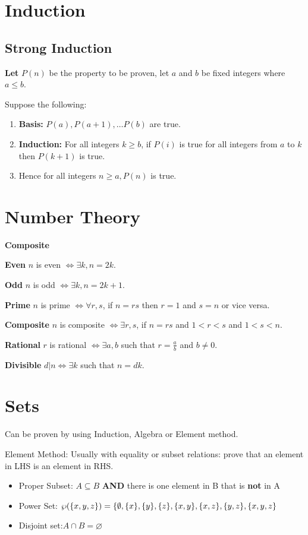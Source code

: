 \documentclass[landscape, letterpaper, 8pt]{extarticle}
\begin{document}
\begin{multicols}{2}
    \section*{Induction}
    \subsection*{Strong Induction}
    \textbf{Let} $P(n)$ be the property to be proven, let $a$ and $b$ be fixed integers where $a\leq b$.

    Suppose the following:
    \begin{enumerate}
        \item \textbf{Basis:} $P(a), P(a+1), \ldots P(b)$ are true.
        \item \textbf{Induction:} For all integers $k\geq b$, if $P(i)$ is true for all integers from $a$ to $k$ then $P(k+1)$ is true.
        \item Hence for all integers $n\geq a, P(n)$ is true.
    \end{enumerate}
    \section*{Number Theory}
    \begin{labeling}{\textbf{Composite}}
        \item [\textbf{Even}] $n$ is even $\iff \exists k, n = 2k$.
        \item [\textbf{Odd}] $n$ is odd $\iff \exists k, n = 2k+1$.
        \item [\textbf{Prime}] $n$ is prime $\iff \forall r, s$, if $n = rs$ then $r=1$ and $s = n$ or vice versa.
        \item [\textbf{Composite}] $n$ is composite $\iff \exists r, s$, if $n = rs$ and $1 < r < s$ and $1 < s < n$.
        \item [\textbf{Rational}] $r$ is rational $\iff \exists a, b$ such that $r = \frac{a}{b}$ and $b \neq 0$.
        \item [\textbf{Divisible}] $d|n \iff \exists k$ such that $n=dk$.
    \end{labeling}
    \section*{Sets}
    Can be proven by using Induction, Algebra or Element method.

    Element Method: Usually with equality or subset relations: prove that an element in LHS is an element in RHS.
    \begin{itemize}[noitemsep,nolistsep]
        \item Proper Subset: $A \subseteq B$ \textbf{AND} there is one element in B that is \textbf{not} in A
        \item Power Set: $\wp(\{x, y, z\}) = \{\emptyset, \{x\}, \{y\}, \{z\},\\
                  \{x, y\},\{x, z\}, \{y, z\}, \{x, y, z\}$
        \item Disjoint set:$A\cap B = \varnothing$
    \end{itemize}

\end{multicols}
\end{document}

